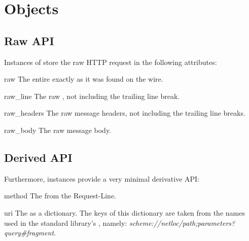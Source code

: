 \section{ Objects \label{request}}

\subsection{Raw API}

Instances of  store the raw HTTP request in the following
attributes:

\begin{datadesc}{raw}
The entire  exactly as it was found on the wire.
\end{datadesc}

\begin{datadesc}{raw_line}
The raw
,
 not including the trailing line break.
\end{datadesc}

\begin{datadesc}{raw_headers}
The raw message headers, not including the trailing line breaks.
\end{datadesc}

\begin{datadesc}{raw_body}
The raw message body.
\end{datadesc}



\subsection{Derived API}

Furthermore,  instances provide a very minimal derivative API:

\begin{datadesc}{method}
The  from the Request-Line.
\end{datadesc}

\begin{datadesc}{uri}
The  as a dictionary. The keys of this dictionary are taken from the
names used in the standard library's
,
namely: \emph{scheme://netloc/path;parameters?query\#fragment}.
\end{datadesc}

